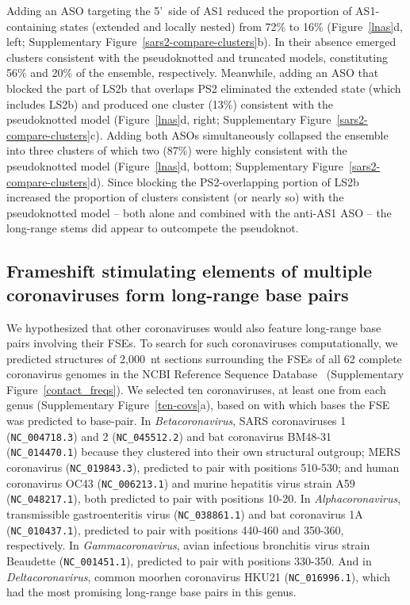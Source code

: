 \documentclass[main.tex]{subfiles}
\begin{document}
Adding an ASO targeting the 5'~side of AS1 reduced the proportion of AS1-containing states (extended and locally nested) from 72\% to 16\% (Figure~\ref{lnas}d, left; Supplementary Figure~\ref{sars2-compare-clusters}b).
In their absence emerged clusters consistent with the pseudoknotted and truncated models, constituting 56\% and 20\% of the ensemble, respectively.
Meanwhile, adding an ASO that blocked the part of LS2b that overlaps PS2 eliminated the extended state (which includes LS2b) and produced one cluster (13\%) consistent with the pseudoknotted model (Figure~\ref{lnas}d, right; Supplementary Figure~\ref{sars2-compare-clusters}c).
Adding both ASOs simultaneously collapsed the ensemble into three clusters of which two (87\%) were highly consistent with the pseudoknotted model (Figure~\ref{lnas}d, bottom; Supplementary Figure~\ref{sars2-compare-clusters}d).
Since blocking the PS2-overlapping portion of LS2b increased the proportion of clusters consistent (or nearly so) with the pseudoknotted model -- both alone and combined with the anti-AS1 ASO -- the long-range stems did appear to outcompete the pseudoknot.

\subsection{Frameshift stimulating elements of multiple coronaviruses form long-range base pairs}

We hypothesized that other coronaviruses would also feature long-range base pairs involving their FSEs.
To search for such coronaviruses computationally, we predicted structures of 2,000~nt sections surrounding the FSEs of all 62 complete coronavirus genomes in the NCBI Reference Sequence Database~\cite{OLeary2016} (Supplementary Figure~\ref{contact_freqs}).
We selected ten coronaviruses, at least one from each genus (Supplementary Figure~\ref{ten-covs}a), based on with which bases the FSE was predicted to base-pair.
In \textit{Betacoronavirus}, SARS coronaviruses 1 (\verb|NC_004718.3|) and 2 (\verb|NC_045512.2|) and bat coronavirus BM48-31 (\verb|NC_014470.1|) because they clustered into their own structural outgroup; MERS coronavirus (\verb|NC_019843.3|), predicted to pair with positions 510-530; and human coronavirus OC43 (\verb|NC_006213.1|) and murine hepatitis virus strain A59 (\verb|NC_048217.1|), both predicted to pair with positions 10-20.
In \textit{Alphacoronavirus}, transmissible gastroenteritis virus (\verb|NC_038861.1|) and bat coronavirus 1A (\verb|NC_010437.1|), predicted to pair with positions 440-460 and 350-360, respectively.
In \textit{Gammacoronavirus}, avian infectious bronchitis virus strain Beaudette (\verb|NC_001451.1|), predicted to pair with positions 330-350.
And in \textit{Deltacoronavirus}, common moorhen coronavirus HKU21 (\verb|NC_016996.1|), which had the most promising long-range base pairs in this genus.
\end{document}
